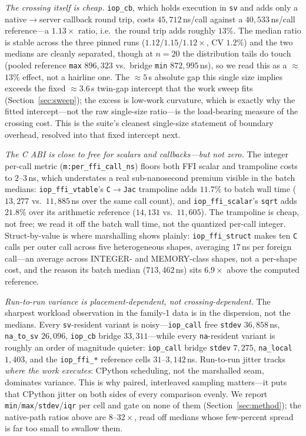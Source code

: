 \documentclass[conference]{IEEEtran}
\newcommand{\code}[1]{\texttt{#1}}
\begin{document}
\emph{The crossing itself is cheap.} \code{iop\_cb}, which holds execution in
\code{sv} and adds only a native$\rightarrow$server callback round trip, costs
$45{,}712$\,ns/call against a $40{,}533$\,ns/call reference---a $1.13\times$
ratio, i.e.\ the round trip adds roughly $13\%$. The median ratio is stable
across the three pinned runs ($1.12$/$1.15$/$1.12\times$, CV $1.2\%$) and the two
medians are cleanly separated, though at $n{=}20$ the distribution tails do touch
(pooled reference \code{max} $896{,}323$ vs.\ bridge \code{min} $872{,}995$\,ns),
so we read this as a $\approx$$13\%$ effect, not a hairline one. The $\approx$$5$\,\textmu s
absolute gap this single size implies exceeds the fixed $\approx$$3.6$\,\textmu s
twin-gap intercept that the work sweep fits (Section~\ref{sec:sweep}); the excess
is low-work curvature, which is exactly why the fitted intercept---not the raw
single-size ratio---is the load-bearing measure of the crossing cost. This is the
suite's cleanest single-size statement of boundary overhead, resolved into that
fixed intercept next.

\emph{The C ABI is close to free for scalars and callbacks---but not zero.} The
integer per-call metric (\code{m:per\_ffi\_call\_ns}) floors both FFI scalar and
trampoline costs to $2$--$3$\,ns, which understates a real sub-nanosecond
premium visible in the batch medians: \code{iop\_ffi\_vtable}'s
\code{C$\rightarrow$Jac} trampoline adds $11.7\%$ to batch wall time
($13{,}277$ vs.\ $11{,}885$\,ns over the same call count), and
\code{iop\_ffi\_scalar}'s \code{sqrt} adds $21.8\%$ over its arithmetic reference
($14{,}131$ vs.\ $11{,}605$). The trampoline is cheap, not free; we read it off
the batch wall time, not the quantized per-call integer. Struct-by-value is
where marshalling shows plainly: \code{iop\_ffi\_struct} makes ten \code{C} calls
per outer call across five heterogeneous shapes, averaging $17$\,ns per foreign
call---an average across INTEGER- and MEMORY-class shapes, not a per-shape cost,
and the reason its batch median ($713{,}462$\,ns) sits $6.9\times$ above the
computed reference.

\emph{Run-to-run variance is placement-dependent, not crossing-dependent.} The
sharpest workload observation in the family-1 data is in the dispersion, not the
medians. Every \code{sv}-resident variant is noisy---\code{iop\_call} free
\code{stdev} $36{,}858$\,ns, \code{na\_to\_sv} $26{,}096$, \code{iop\_cb} bridge
$33{,}311$---while every \code{na}-resident variant is roughly an order of
magnitude quieter: \code{iop\_call} bridge \code{stdev} $7{,}275$,
\code{na\_local} $1{,}403$, and the \code{iop\_ffi\_*} reference cells
$31$--$3{,}142$\,ns. Run-to-run jitter tracks \emph{where the work executes}:
CPython scheduling, not the marshalled seam, dominates variance. This is why
paired, interleaved sampling matters---it puts that CPython jitter on both sides
of every comparison evenly. We report \code{min}/\code{max}/\code{stdev}/\code{iqr}
per cell and gate on none of them (Section~\ref{sec:method}); the native-path
ratios above are $8$--$32\times$, read off medians whose few-percent spread is far
too small to swallow them.
\end{document}
